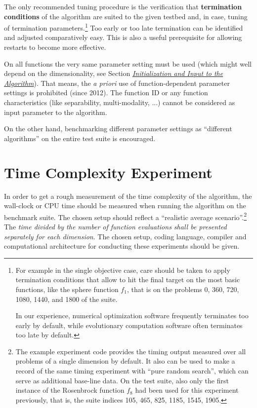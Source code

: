 \documentclass[letterpaper,12pt,english]{article}
\begin{document}
The only recommended tuning procedure is the verification that \textbf{termination
conditions} of the algorithm are suited to the given testbed and, in case,
tuning of termination parameters.\footnote[6]{
For example in the single objective case, care should be
taken to apply termination conditions that allow to hit the final target on
the most basic functions, like the sphere function \(f_1\), that is on the
problems 0, 360, 720, 1080, 1440, and 1800 of the  suite.

In our experience, numerical optimization software frequently terminates
too early by default, while evolutionary computation software often
terminates too late by default.
}
Too early or too late termination can be identified and adjusted comparatively
easy.
This is also a useful prerequisite for allowing restarts to become more effective.

On all functions the very same parameter setting must be used (which might
well depend on the dimensionality, see Section {\hyperref[index:sec\string-input]{\emph{Initialization and Input to the Algorithm}}}). That means,
the \emph{a priori} use of function-dependent parameter settings is prohibited
(since 2012).  The function ID or any function characteristics (like
separability, multi-modality, ...) cannot be considered as input parameter to
the algorithm.

On the other hand, benchmarking different parameter settings as ``different
algorithms'' on the entire test suite is encouraged.


\section{Time Complexity Experiment}
\label{index:time-complexity-experiment}
In order to get a rough measurement of the time complexity of the algorithm, the
wall-clock or CPU time should be measured when running the algorithm on the
benchmark suite. The chosen setup should reflect a ``realistic average
scenario''.\footnote[7]{
The example experiment code provides the timing output measured over all
problems of a single dimension by default. It also can be used to make a record
of the same timing experiment with ``pure random search'', which can serve as
additional base-line data. On the  test suite, also only the
first instance of the Rosenbrock function \(f_8\) had been used for this
experiment previously, that is, the suite indices 105, 465, 825, 1185, 1545,
1905.
}
The \emph{time divided by the number of function evaluations shall be presented
separately for each dimension}. The chosen setup, coding language, compiler and
computational architecture for conducting these experiments should be given.
\end{document}
